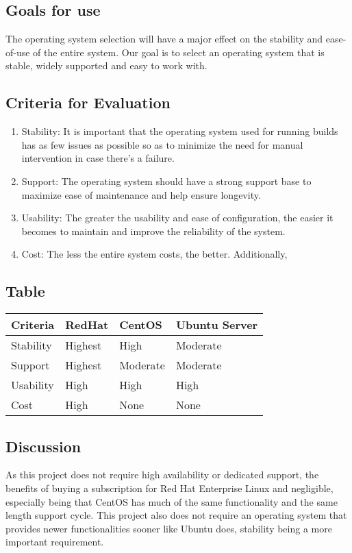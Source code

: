 \documentclass[10pt,letterpaper,onecolumn,journal]{IEEEtran}
\begin{document}
\subsection{Goals for use}
The operating system  selection will have a major effect on the stability and ease-of-use of the entire system. Our goal is to select an operating system that is stable, widely supported and easy to work with.
\subsection{Criteria for Evaluation}
\begin{enumerate}
  \item Stability: It is important that the operating system used for running builds has as few issues as possible so as to minimize the need for manual intervention in case there's a failure.
  \item Support: The operating system should have a strong support base to maximize ease of maintenance and help ensure longevity.
  \item Usability: The greater the usability and ease of configuration, the easier it becomes to maintain and improve the reliability of the system.
  \item Cost: The less the entire system costs, the better. Additionally, 
\end{enumerate}
\subsection{Table}
\begin{center}
  \begin{tabular}{llll}
    Criteria & RedHat & CentOS & Ubuntu Server \\ \midrule
    Stability       & Highest & High & Moderate \\ \midrule
    Support           & Highest & Moderate & Moderate \\ \midrule
    Usability       & High & High & High \\ \midrule
    Cost       & High & None & None \\ \bottomrule
  \end{tabular}
\end{center}
\subsection{Discussion}
As this project does not require high availability or dedicated support, the benefits of buying a subscription for Red Hat Enterprise Linux and negligible, especially being that CentOS has much of the same functionality and the same length support cycle. This project also does not require an operating system that provides newer functionalities sooner like Ubuntu does, stability being a more important requirement.
\end{document}
